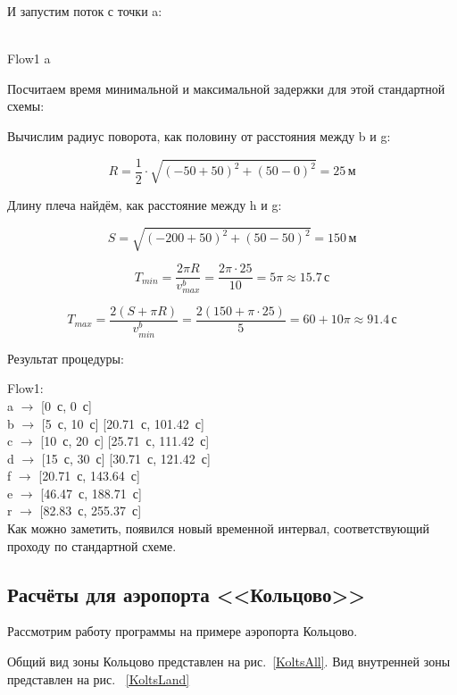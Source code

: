 \documentclass[12pt]{article}
\theoremstyle{plain}
\begin{document}
И запустим поток с точки a:

\\
Flow1 a

Посчитаем время минимальной и максимальной задержки для этой стандартной схемы:

Вычислим радиус поворота, как половину от расстояния между b и g:

$$
 R = \frac{1}{2} \cdot \sqrt{(-50 + 50)^2 + (50 - 0)^2} = 25\,\text{м}
$$

Длину плеча найдём, как расстояние между h и g:

$$
S = \sqrt{(-200 + 50)^2 + (50 - 50)^2} = 150\,\text{м}
$$

$$
T_{min} = \frac{2 \pi R}{v_{max}^b} = \frac{2 \pi \cdot 25}{10} = 5\pi \approx 15.7\,\text{с}
$$

$$
T_{max} = \frac{2(S + \pi R)}{v_{min}^b} = \frac{2(150 + \pi \cdot 25)}{5} = 60 + 10\pi \approx 91.4\,\text{с}
$$

Результат процедуры:

\noindent Flow1:\\
a $\rightarrow$ [0~с, 0~с]\\
b $\rightarrow$ [5~с, 10~с] [20.71~с, 101.42~с]\\
c $\rightarrow$ [10~с, 20~с] [25.71~с, 111.42~с]\\
d $\rightarrow$ [15~с, 30~с] [30.71~с, 121.42~с]\\
f $\rightarrow$ [20.71~с, 143.64~с]\\
e $\rightarrow$ [46.47~с, 188.71~с]\\
r $\rightarrow$ [82.83~с, 255.37~с]\\


Как можно заметить, появился новый временной интервал, соответствующий проходу по стандартной схеме.

\newpage



\subsection{Расчёты для аэропорта <<Кольцово>>}

Рассмотрим работу программы на примере аэропорта Кольцово.

Общий вид зоны Кольцово представлен на рис.~\ref{KoltsAll}. Вид внутренней зоны представлен на рис.~ \ref{KoltsLand}
\end{document}

